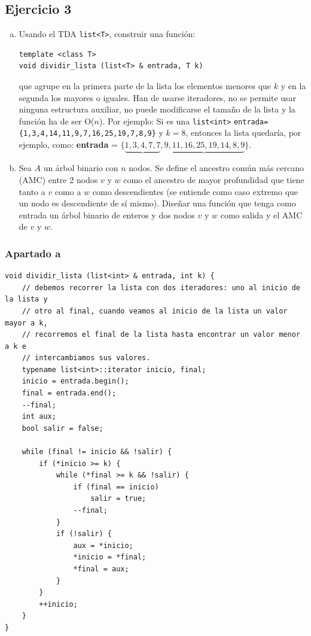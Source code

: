 \documentclass[10pt,a4paper,spanish]{report}
\begin{document}
\subsection{\textcolor[rgb]{0.5,0.8,1}Ejercicio 3}
\begin{enumerate}[a)]
\item 
Usando el TDA \verb*|list<T>|, construir una función:

\begin{verbatim}
template <class T>
void dividir_lista (list<T> & entrada, T k)
\end{verbatim}

\noindent
que agrupe en la primera parte de la lista los elementos menores que $k$ y en la segunda los mayores o iguales. Han de usarse iteradores, no se permite usar ninguna estructura auxiliar, no puede modificarse el tamaño de la lista y la función ha de ser O($n$). Por ejemplo: Si es una \verb*|list<int>| \verb*|entrada={1,3,4,14,11,9,7,16,25,19,7,8,9}| y $k=8$, entonces la lista quedaría, por ejemplo, como: \textbf{entrada} = $\{\underbrace{1,3,4,7,7},\underbrace{9,11,16,25,19,14,8,9}\}.$

\item
Sea $A$ un árbol binario con $n$ nodos. Se define el ancestro común más cercano (AMC) entre 2 nodos $v$ y $w$ como el ancestro de mayor profundidad que tiene tanto a $v$ como a $w$ como descendientes (se entiende como caso extremo que un nodo es descendiente de sí mismo). Diseñar una función que tenga como entrada un árbol binario de enteros y dos nodos $v$ y $w$ como salida y el AMC de $v$ y $w$.
\end{enumerate}

\subsubsection{\textcolor[rgb]{0.5,0.8,1}Apartado a}
\begin{verbatim}
void dividir_lista (list<int> & entrada, int k) {
    // debemos recorrer la lista con dos iteradores: uno al inicio de la lista y
    // otro al final, cuando veamos al inicio de la lista un valor mayor a k,
    // recorremos el final de la lista hasta encontrar un valor menor a k e 
    // intercambiamos sus valores.
    typename list<int>::iterator inicio, final;
    inicio = entrada.begin();
    final = entrada.end();
    --final;
    int aux;
    bool salir = false;

    while (final != inicio && !salir) {
        if (*inicio >= k) {
            while (*final >= k && !salir) {
                if (final == inicio)
                    salir = true;
                --final;
            }
            if (!salir) {
                aux = *inicio;
                *inicio = *final;
                *final = aux;
            }
        }
        ++inicio;
    }
}
\end{verbatim}
\end{document}
